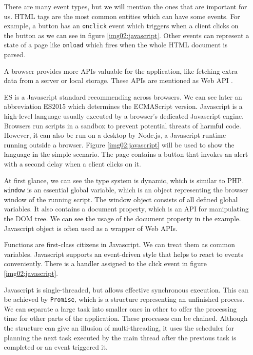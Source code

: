 There are many event types, but we will mention the ones that are important for us.
HTML tags are the most common entities which can have some events.
For example, a button has an \texttt{onclick} event which triggers when a client clicks on the button as we can see in figure \ref{img02:javascript}. 
Other events can represent a state of a page like \texttt{onload} which fires when the whole HTML document is parsed.
\par
A browser provides more APIs valuable for the application, like fetching extra data from a server or local storage.
These APIs are mentioned as Web API \cite{online:webApi}.
\par
\ac{ES} is a Javascript standard recommending across browsers.
We can see later an abbreviation ES2015 which determines the ECMAScript version.
Javascript is a high-level language usually executed by a browser's dedicated Javascript engine.
Browsers run scripts in a sandbox to prevent potential threats of harmful code.
However, it can also be run on a desktop by Node.js, a Javascript runtime running outside a browser.
Figure \ref{img02:javascript} will be used to show the language in the simple scenario.
The page contains a button that invokes an alert with a second delay when a client clicks on it.
\par
At first glance, we can see the type system is dynamic, which is similar to PHP.
\texttt{window} is an essential global variable, which is an object representing the browser window of the running script.
The window object consists of all defined global variables.
It also contains a document property, which is an API for manipulating the DOM tree.
We can see the usage of the document property in the example.
Javascript object is often used as a wrapper of Web APIs.
\par
Functions are first-class citizens in Javascript.
We can treat them as common variables.
Javascript supports an event-driven style that helps to react to events conveniently.
There is a handler assigned to the click event in figure \ref{img02:javascript}.
\par
Javascript is single-threaded, but allows effective synchronous execution.
This can be achieved by \texttt{Promise}, which is a structure representing an unfinished process.
We can separate a large task into smaller ones in other to offer the processing time for other parts of the application.
These processes can be chained.
Although the structure can give an illusion of multi-threading, it uses the scheduler for planning the next task executed by the main thread after the previous task is completed or an event triggered it.
